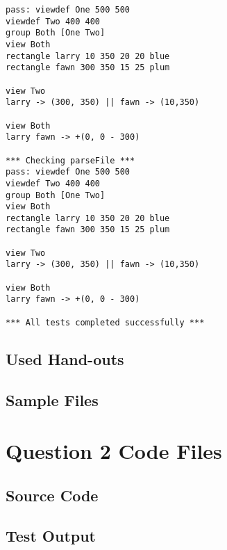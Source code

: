 \documentclass[
paper=a4,
oneside,
fontsize=11pt,
numbers=noenddot,
headinclude=false, %
footinclude=false, %
fleqn,             %
DIV=8
]{scrartcl}
\begin{document}
\begin{lstlisting}[caption=Session output: {\tt src/salsa/SalsaParserTest}, label=lst:testoutparser]
pass: viewdef One 500 500
viewdef Two 400 400
group Both [One Two]
view Both
rectangle larry 10 350 20 20 blue
rectangle fawn 300 350 15 25 plum

view Two
larry -> (300, 350) || fawn -> (10,350)

view Both
larry fawn -> +(0, 0 - 300)

*** Checking parseFile ***
pass: viewdef One 500 500
viewdef Two 400 400
group Both [One Two]
view Both
rectangle larry 10 350 20 20 blue
rectangle fawn 300 350 15 25 plum

view Two
larry -> (300, 350) || fawn -> (10,350)

view Both
larry fawn -> +(0, 0 - 300)

*** All tests completed successfully ***
\end{lstlisting}


\subsection{Used Hand-outs}
\label{sec:hand-outs-used}


\subsection{Sample Files}
\label{sec:sample-files}




\clearpage
\section{Question 2 Code Files}
\label{sec:question-2-code}

\subsection{Source Code}
\label{sec:source-2-code}


\subsection{Test Output}
\label{sec:test-2-output}
\end{document}
